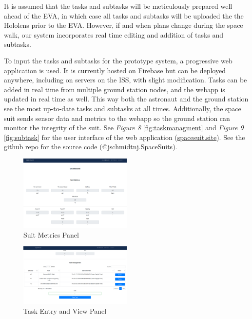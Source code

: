 \documentclass{article}
\begin{document}
It is assumed that the tasks and subtasks will be meticulously prepared 
well ahead of the EVA, in which case all tasks and subtasks will be 
uploaded the the Hololens prior to the EVA. However, if and when plans 
change during the space walk, our system incorporates real time editing 
and addition of tasks and subtasks.

To input the tasks and subtasks for the prototype system, a progressive 
web application is used. It is currently hosted on Firebase but can be 
deployed anywhere, including on servers on the ISS, with slight 
modification. Tasks can be added in real time from multiple ground 
station nodes, and the webapp is updated in real time as well. This way 
both the astronaut and the ground station see the most up-to-date tasks 
and subtasks at all times. Additionally, the space suit sends sensor 
data and metrics to the webapp so the ground station can monitor the 
integrity of the suit. See \textit{Figure 8} \ref{fig:taskmanagment} and 
\textit{Figure 9} \ref{fig:subtask} for the user interface of the web 
application (\href{https://spacesuit.site}{spacesuit.site}). See the 
github repo for the source code 
(\href{https://github.com/jschmidtnj/spacesuits}{@jschmidtnj.SpaceSuits}).

\begin{figure}[!htb]
  \centering
  
\includegraphics[width=0.5\textwidth]{assets/groundcontrolsuitmetrics.png}
  \caption{Suit Metrics Panel}
  \label{fig:groundcontrolsuitmetrics}
\end{figure}

\begin{figure}[!htb]
  \centering
  \includegraphics[width=0.5\textwidth]{assets/taskmanagment.png}
  \caption{Task Entry and View Panel}
  \label{fig:syntheticfiberuse}
\end{figure}
\end{document}
